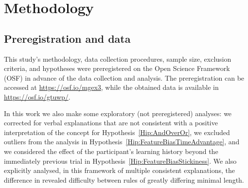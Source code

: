     


\section{Methodology}\label{Sec:AdditionalMethodology}


\subsection{Preregistration and data}
This study's methodology, data collection procedures, sample size, exclusion criteria, and hypotheses were preregistered on the Open Science Framework (OSF) in advance of the data collection and analysis. The preregistration can be accessed at \url{https://osf.io/mgex3}, while the obtained data is available in \url{https://osf.io/gtuwp/}.


In this work we also make some exploratory (not preregistered) analyses: we corrected for verbal explanations that are not consistent with a positive interpretation of the concept for Hypothesis~\ref{Hip:AndOverOr}, we excluded outliers from the analysis in Hypothesis~\ref{Hip:FeatureBiasTimeAdvantage}, and we considered the effect of the participant's learning history  beyond the immediately previous trial in Hypothesis~\ref{Hip:FeatureBiasStickiness}. We also explicitly analysed, in this framework of multiple consistent explanations, the difference in revealed difficulty between rules of greatly differing minimal length.



